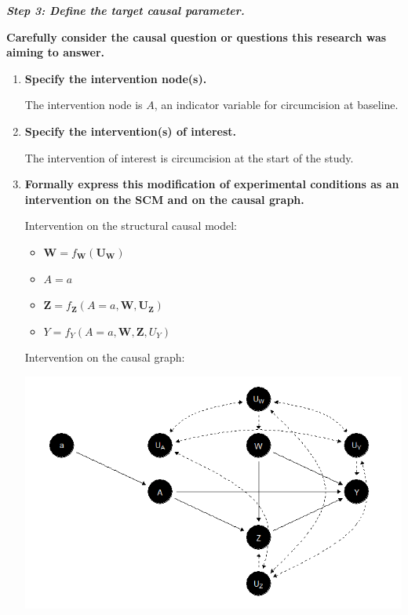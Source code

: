 \documentclass{article}
\begin{document}
\pagebreak





\textbf{\textit{Step 3: Define the target causal parameter.}}

\vspace{2mm}

\textbf{Carefully consider the causal question or questions this research was aiming to answer.}

\begin{enumerate}[label=\textbf{(\alph*)}]

  \item \textbf{Specify the intervention node(s).}
  
  The intervention node is $A$, an indicator variable for circumcision at baseline.

  \item \textbf{Specify the intervention(s) of interest.}
  
  The intervention of interest is circumcision at the start of the study.

  \item \textbf{Formally express this modification of experimental conditions as an intervention on the SCM and on the causal graph.}
  
  Intervention on the structural causal model:
  
  \begin{itemize}
  
    \item $\bm{W} = f_{\bm{W}} (\bm{U_W})$
    \item $A = a$
    \item $\bm{Z} = f_{\bm{Z}}(A = a, \bm{W}, \bm{U_Z})$
    \item $Y = f_Y(A = a, \bm{W}, \bm{Z}, U_Y)$
  
  \end{itemize}
  
  
  Intervention on the causal graph:
  
  \vspace{2mm}
  
  \includegraphics[scale=0.8]{dag_two.png}


\end{enumerate}
\end{document}
